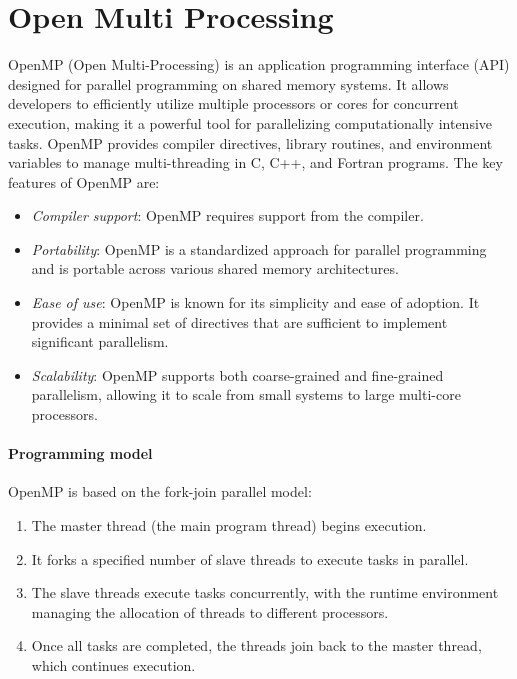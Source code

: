 \section{Open Multi Processing}

OpenMP (Open Multi-Processing) is an application programming interface (API) designed for parallel programming on shared memory systems. 
It allows developers to efficiently utilize multiple processors or cores for concurrent execution, making it a powerful tool for parallelizing computationally intensive tasks. 
OpenMP provides compiler directives, library routines, and environment variables to manage multi-threading in C, C++, and Fortran programs.
\noindent The key features of OpenMP are: 
\begin{itemize}
    \item \textit{Compiler support}: OpenMP requires support from the compiler.
    \item \textit{Portability}: OpenMP is a standardized approach for parallel programming and is portable across various shared memory architectures.
    \item \textit{Ease of use}: OpenMP is known for its simplicity and ease of adoption. 
        It provides a minimal set of directives that are sufficient to implement significant parallelism. 
    \item \textit{Scalability}: OpenMP supports both coarse-grained and fine-grained parallelism, allowing it to scale from small systems to large multi-core processors.
\end{itemize}

\paragraph*{Programming model}
OpenMP is based on the fork-join parallel model:
\begin{enumerate}
    \item The master thread (the main program thread) begins execution.
    \item It forks a specified number of slave threads to execute tasks in parallel.
    \item The slave threads execute tasks concurrently, with the runtime environment managing the allocation of threads to different processors.
    \item Once all tasks are completed, the threads join back to the master thread, which continues execution.
\end{enumerate}

